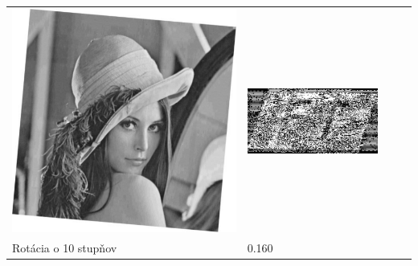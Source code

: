 \begin{table}[h]
\begin{tabular}{llcc}
\begin{minipage}[c]{.1\textwidth}
  \includegraphics[scale=0.1]{obrazky/rotation5}
\end{minipage}
 &
 \begin{minipage}[c]{.15\textwidth}
   \includegraphics[scale=0.25]{obrazky/rotation5-wm}
 \end{minipage} \\
Rotácia o 10 stupňov                   & 0.160 &
\begin{minipage}[c]{.1\textwidth}
\ 

\end{minipage}
\end{tabular}
\end{table}
